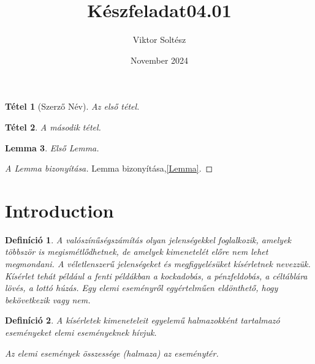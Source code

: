 \documentclass{article}
\title{Készfeladat04.01}
\author{Viktor Soltész}
\date{November 2024}
\newtheorem{theorem}{Tétel}
\newtheorem{lemma}[theorem]{Lemma}
\newtheorem{definition}{Definíció}[section]
\begin{document}
\maketitle

\begin{theorem}[Szerző Név]
Az első tétel.
\end{theorem}

\begin{theorem}
A második tétel.
\end{theorem}

\begin{lemma}
Első Lemma.
\end{lemma}

\begin{proof}[A Lemma bizonyítása]
Lemma bizonyítása,\ref{Lemma}.
\end{proof}



\section{Introduction}

\begin{definition}
      A valószínűségszámítás olyan jelenségekkel foglalkozik, amelyek többször is megismétlődhetnek, de amelyek kimenetelét előre nem lehet megmondani. A véletlenszerű jelenségeket és megfigyelésüket kísérletnek nevezzük. Kísérlet tehát például a fenti példákban a kockadobás, a pénzfeldobás, a céltáblára lövés, a lottó húzás. Egy elemi eseményről egyértelműen eldönthető, hogy bekövetkezik vagy nem.
\end{definition}

\begin{definition}
    A kísérletek kimeneteleit egyelemű halmazokként tartalmazó eseményeket elemi eseményeknek hívjuk. 

Az elemi események összessége (halmaza) az eseménytér.
\end{definition}
\end{document}
